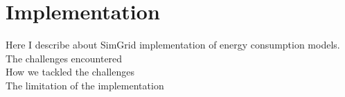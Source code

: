 \chapter{Implementation}
\label{chapter:implementation}

Here I describe about SimGrid implementation of energy consumption models.\\
The challenges encountered\\
How we tackled the challenges\\
The limitation of the implementation\\
